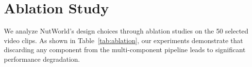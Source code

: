 \section{Ablation Study} 




We analyze NutWorld's design choices through ablation studies on the 50 selected video clips. As shown in Table~\ref{tab:ablation}, our experiments demonstrate that discarding any component from the multi-component pipeline leads to significant performance degradation.


